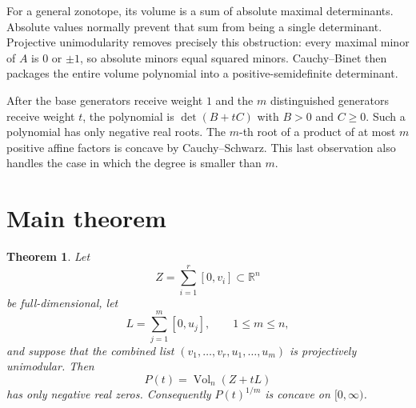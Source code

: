 \documentclass[11pt]{article}
\newtheorem{theorem}{Theorem}
\theoremstyle{definition}
\newcommand{\Vol}{\operatorname{Vol}}
\newcommand{\R}{\mathbb{R}}
\begin{document}
For a general zonotope, its volume is a sum of absolute maximal determinants.
Absolute values normally prevent that sum from being a single determinant.
Projective unimodularity removes precisely this obstruction: every maximal
minor of \(A\) is \(0\) or \(\pm1\), so absolute minors equal squared minors.
Cauchy--Binet then packages the entire volume polynomial into a
positive-semidefinite determinant.

After the base generators receive weight \(1\) and the \(m\) distinguished
generators receive weight \(t\), the polynomial is \(\det(B+tC)\) with
\(B>0\) and \(C\geq0\).  Such a polynomial has only negative real roots.
The \(m\)-th root of a product of at most \(m\) positive affine factors is
concave by Cauchy--Schwarz.  This last observation also handles the case in
which the degree is smaller than \(m\).

\section{Main theorem}

\begin{theorem}\label{thm:main}
Let
\[
 Z=\sum_{i=1}^{r}[0,v_i]\subset\R^n
\]
be full-dimensional, let
\[
 L=\sum_{j=1}^{m}[0,u_j],\qquad 1\leq m\leq n,
\]
and suppose that the combined list
\((v_1,\ldots,v_r,u_1,\ldots,u_m)\) is projectively unimodular.
Then
\[
 P(t)=\Vol_n(Z+tL)
\]
has only negative real zeros.  Consequently \(P(t)^{1/m}\) is concave on
\([0,\infty)\).
\end{theorem}
\end{document}
